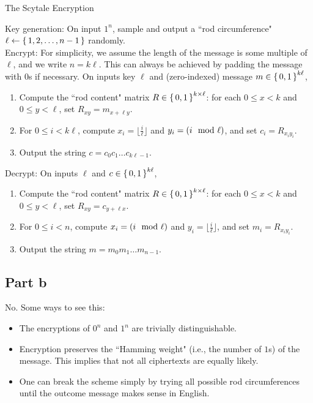 \documentclass{article}
\begin{document}
\begin{algorithm}
    \caption{The Scytale Encryption}
    \label{alg:scytale}
    Key generation: On input $1^n$, sample and output a ``rod circumference" $\ell\gets\set{1, 2, \ldots, n - 1}$ randomly.\\
    
    Encrypt: For simplicity, we assume the length of the message is some multiple of $\ell$, and we write $n=k\ell$. This can always be achieved by padding the message with $0$s if necessary.
    On inputs key $\ell$ and (zero-indexed) message $m\in\set{0, 1}^{k\ell}$,
    \begin{enumerate}
        \item Compute the ``rod content" matrix $R\in\set{0, 1}^{k\times\ell}$:
        for each $0\leq x < k$ and $0\leq y < \ell$, set $R_{xy} = m_{x+\ell y}$.
        \item For $0\leq i< k\ell$, compute $x_i=\lfloor\frac{i}{\ell}\rfloor$ and $y_i=\left(i\mod \ell\right)$, and set $c_i=R_{x_iy_i}$.
        \item Output the string $c=c_0c_1\ldots c_{k\ell-1}$.
    \end{enumerate}
    Decrypt: On inputs $\ell$ and $c\in\set{0, 1}^{k\ell}$,
    \begin{enumerate}
        \item Compute the ``rod content" matrix $R\in\set{0, 1}^{k\times\ell}$:
        for each $0\leq x < k$ and $0\leq y < \ell$, set $R_{xy} = c_{y+\ell x}$.
        \item For $0\leq i < n$, compute $x_i=\left(i\mod \ell\right)$ and $y_i=\lfloor\frac{i}{\ell}\rfloor$, and set $m_i=R_{x_iy_i}$.
        \item Output the string $m=m_0m_1\ldots m_{n-1}$.
    \end{enumerate}
\end{algorithm}

\subsection*{Part b}

No. Some ways to see this:
\begin{itemize}
    \item The encryptions of $0^n$ and $1^n$ are trivially distinguishable.
    \item Encryption preserves the ``Hamming weight" (i.e., the number of $1$s) of the message. This implies that not all ciphertexts are equally likely.
    \item One can break the scheme simply by trying all possible rod circumferences until the outcome message makes sense in English.
\end{itemize}
\end{document}
